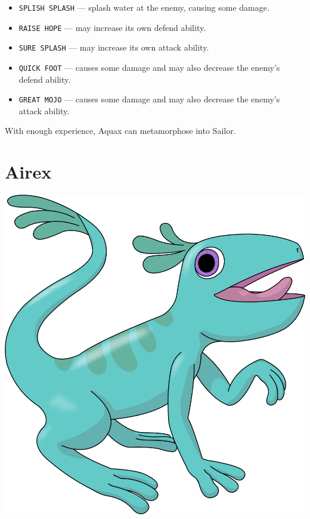 \documentclass[10pt,twocolumn,openany,article]{memoir}
\begin{document}
\begin{itemize}
\item  \texttt{SPLISH SPLASH}  --- splash  water at  the enemy,  causing
  some damage. 
\item \texttt{RAISE HOPE} --- may increase its own defend ability.
\item \texttt{SURE SPLASH} --- may increase its own attack ability.
\item \texttt{QUICK FOOT}  --- causes some damage and  may also decrease
  the enemy's defend ability.
\item \texttt{GREAT MOJO}  --- causes some damage and  may also decrease
  the enemy's attack ability.
\end{itemize}

With enough experience, Aquax can metamorphose into Sailor.

\ifdefined\DEMO\else

\section{Airex}

\begin{center}
  \includegraphics[width=\columnwidth]{../Manual/Airex.png}
\end{center}
\end{document}
